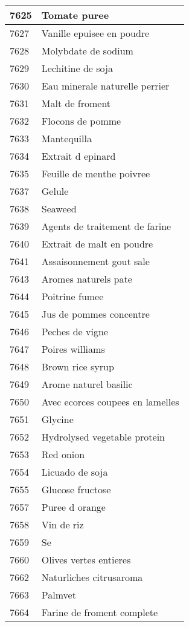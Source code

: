 \begin{longtable}{|l|l|}
7625 & Tomate puree \\ \hline 
7627 & Vanille epuisee en poudre \\ \hline 
7628 & Molybdate de sodium \\ \hline 
7629 & Lechitine de soja \\ \hline 
7630 & Eau minerale naturelle perrier \\ \hline 
7631 & Malt de froment \\ \hline 
7632 & Flocons de pomme \\ \hline 
7633 & Mantequilla \\ \hline 
7634 & Extrait d epinard \\ \hline 
7635 & Feuille de menthe poivree \\ \hline 
7637 & Gelule \\ \hline 
7638 & Seaweed \\ \hline 
7639 & Agents de traitement de farine \\ \hline 
7640 & Extrait de malt en poudre \\ \hline 
7641 & Assaisonnement gout sale \\ \hline 
7643 & Aromes naturels pate \\ \hline 
7644 & Poitrine fumee \\ \hline 
7645 & Jus de pommes concentre \\ \hline 
7646 & Peches de vigne \\ \hline 
7647 & Poires williams \\ \hline 
7648 & Brown rice syrup \\ \hline 
7649 & Arome naturel basilic \\ \hline 
7650 & Avec ecorces coupees en lamelles \\ \hline 
7651 & Glycine \\ \hline 
7652 & Hydrolysed vegetable protein \\ \hline 
7653 & Red onion \\ \hline 
7654 & Licuado de soja \\ \hline 
7655 & Glucose fructose \\ \hline 
7657 & Puree d orange \\ \hline 
7658 & Vin de riz \\ \hline 
7659 & Se \\ \hline 
7660 & Olives vertes entieres \\ \hline 
7662 & Naturliches citrusaroma \\ \hline 
7663 & Palmvet \\ \hline 
7664 & Farine de froment complete \\ \hline 

\end{longtable}
